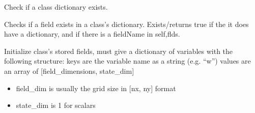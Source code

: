 \documentclass[letterpaper,10pt,english]{sphinxmanual}
\begin{document}
\begin{fulllineitems}
\begin{fulllineitems}
\end{fulllineitems}


\begin{fulllineitems}
\label{\detokenize{autoapi/Workspace/index:Workspace.Workspace.has_dict}}
\sphinxAtStartPar
Check if a class dictionary exists.

\end{fulllineitems}


\begin{fulllineitems}
\label{\detokenize{autoapi/Workspace/index:Workspace.Workspace.exists}}
\sphinxAtStartPar
Checks if a field exists in a class’s dictionary.
Exists/returns true if the it does have a dictionary,
and if there is a fieldName in self,flds.

\end{fulllineitems}


\begin{fulllineitems}
\label{\detokenize{autoapi/Workspace/index:Workspace.Workspace.init_vars}}
\sphinxAtStartPar
Initialize class’s stored fields,
must give a dictionary of variables with the following structure:
\sphinxhyphen{} keys are the variable name as a string (e.g. “w”)
\sphinxhyphen{} values are an array of {[}field\_dimensions, state\_dim{]}
\begin{itemize}
\item {} 
\sphinxAtStartPar
field\_dim is usually the grid size in {[}nx, ny{]} format

\item {} 
\sphinxAtStartPar
state\_dim is 1 for scalars


\end{itemize}
\end{fulllineitems}
\end{fulllineitems}
\end{document}
